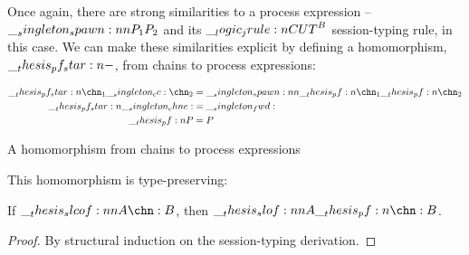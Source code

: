 Once again, there are strong similarities to a process expression -- $\__singleton_spawn:nn {P_1} {P_2}$ and its $\__logic_jrule:n {CUT}^B$ session-typing rule, in this case.
We can make these similarities explicit by defining a homomorphism, $\pf*{-}$, from chains to process expressions:
\begin{marginfigure}
  \begin{align*}
    \pf*{\chn_1 \cc \chn_2} &= \spawn{\pf{\chn_1}}{\pf{\chn_2}} \\
    \pf*{\chne} &= \fwd \\
    \pf{P} &= P
  \end{align*}
  \caption{A homomorphism from chains to process expressions}
\end{marginfigure}%
%
This homomorphism is type-preserving:
\begin{theorem}
  If $\slcof{A |- \chn : B}$, then $\slof{A |- \pf{\chn} : B}$.
\end{theorem}
\begin{proof}
  By structural induction on the session-typing derivation.
\end{proof}



 

 
